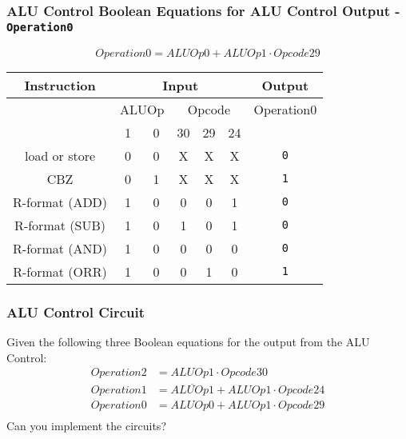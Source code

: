 \begin{frame}[fragile]\frametitle{ALU Control Boolean Equations for ALU Control Output - \texttt{Operation0}}
$$Operation0=ALUOp0 + ALUOp1 \cdot Opcode29$$
\begin{center}
\begin{tabular}{c|cc|ccc|c}
Instruction   &  \multicolumn{5}{|c|}{Input} & \multicolumn{1}{|c}{Output}\\\hline
              & \multicolumn{2}{|c|}{ALUOp} &  \multicolumn{3}{|c|}{Opcode} & Operation0\\
 & 1 & 0 & 30 & 29 & 24 & \\\hline
load or store & 0 & 0 &  X & X & X & \texttt{0}\\
CBZ           & 0 & 1 &  X & X & X & \texttt{1}\\
R-format (ADD)& 1 & 0 &  0 & 0 & 1 & \texttt{0}\\
R-format (SUB)& 1 & 0 &  1 & 0 & 1 & \texttt{0}\\
R-format (AND)& 1 & 0 &  0 & 0 & 0 & \texttt{0}\\
R-format (ORR)& 1 & 0 &  0 & 1 & 0 & \texttt{1}\\
\end{tabular}
\end{center}

\end{frame}
\begin{frame}[fragile]\frametitle{ALU Control Circuit}

 \begin{tcolorbox}[enhanced,attach boxed title to top center={yshift=-3mm,yshifttext=-1mm},
  colback=red!5!white,colframe=red!75!black,colbacktitle=red!80!black,
  title=Try this,fonttitle=\bfseries,
  boxed title style={size=small,colframe=red!50!black} ]
Given the following three Boolean equations for the output from the ALU Control:
\begin{align*}
Operation2&=ALUOp1 \cdot Opcode30 \\
Operation1&= \overline{ALUOp1} + ALUOp1 \cdot Opcode24\\
Operation0&=ALUOp0 + ALUOp1 \cdot Opcode29 \\
\end{align*}
Can you implement the circuits?
  \end{tcolorbox}

\end{frame} 

